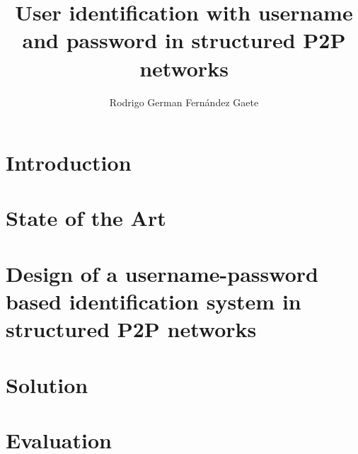 \documentclass[letter, 12pt]{report}
\title{User identification with username and password in structured P2P networks}
\author{Rodrigo German Fernández Gaete}
\begin{document}


\beforepreface





\newpage


\newpage

\afterpreface


\renewcommand{\chaptername}{Chapter}
\setcounter{secnumdepth}{3}
\setcounter{tocdepth}{3}

\chapter{Introduction}
\label{sec:intro}



\chapter{State of the Art}
\label{sec:soa_p2p}


\label{sec:soa_p2p_user_identification}


\label{sec:soa_p2p_trust}


\chapter{Design of a username-password based identification system in structured P2P networks}
\label{sec:formalization}

\chapter{Solution}
\label{sec:system}


\chapter{Evaluation}
\label{sec:evaluation}

\end{document}
